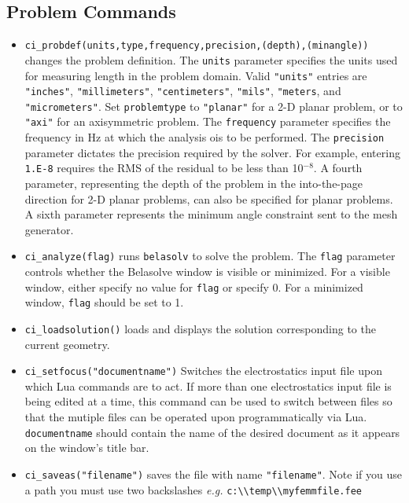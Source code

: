 \subsection{Problem Commands}

\begin{itemize}
\item {\tt ci\_probdef(units,type,frequency,precision,(depth),(minangle))} changes the problem
definition. The \texttt{units} parameter specifies the units used
for measuring length in the problem domain. Valid \texttt{"units"}
entries are
\texttt{"inches"}, \texttt{"millimeters"}, \texttt{"centimeters"},
\texttt{"mils"}, \texttt{"meters}, and \texttt{"micrometers"}. Set
\texttt{problemtype} to \texttt{"planar"} for a 2-D planar problem, or to
\texttt{"axi"} for an axisymmetric problem. The \texttt{frequency} parameter specifies the frequency
in Hz at which the analysis ois to be performed. The \texttt{precision} parameter
dictates the precision required by the solver. For example, entering
\texttt{1.E-8} requires the RMS of the residual to be less than 10$^{ - 8}$.
A fourth parameter, representing the depth of the problem in the
into-the-page direction for 2-D planar problems, can also be specified
for planar problems. A sixth parameter represents the minimum angle constraint sent to the mesh generator.

\item {\tt ci\_analyze(flag)} runs \texttt{belasolv} to solve the problem. The
\texttt{flag} parameter controls whether the Belasolve window is visible or
minimized. For a visible window, either specify no value for
\texttt{flag} or specify 0. For a minimized window, \texttt{flag}
should be set to 1.

\item {\tt ci\_loadsolution()} loads and displays the solution corresponding to the
current geometry.

\item {\tt ci\_setfocus("documentname")} Switches the
electrostatics input file upon which Lua commands are to act. If
more than one electrostatics input file is being edited at a time,
this command can be used to switch between files so that the
mutiple files can be operated upon programmatically via Lua. {\tt
documentname} should contain the name of the desired document as
it appears on the window's title bar.

\item {\tt ci\_saveas("filename")} saves the file with name
\texttt{"filename"}. Note if you use a path you must use two backslashes
{\em e.g.} \verb+c:\\temp\\myfemmfile.fee+

\end{itemize}

